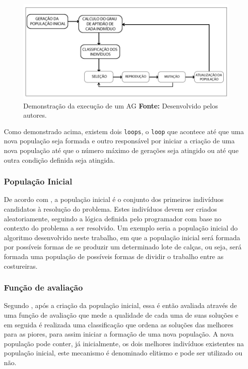 \begin{figure}[h!]
	\centerline{\includegraphics[scale=0.6]{./imagens/algoritimos_geneticos.jpg}}
	\caption[Demonstração da execução de um AG]
	{Demonstração da execução de um AG \textbf{Fonte:} Desenvolvido pelos autores.}
	\label{fig:representacao_ags}
\end{figure}

\par Como demonstrado acima, existem dois \texttt{loops}, o
\texttt{loop} que acontece até que uma nova população seja formada e outro
responsável por  iniciar a criação de uma nova população até que o
número máximo de gerações seja atingido ou até que outra condição definida seja
atingida.

\subsubsection{População Inicial}

\par De acordo com , a população inicial 
é o conjunto dos primeiros indivíduos candidatos à resolução do problema. Estes
indivíduos devem ser criados aleatoriamente, seguindo a lógica definida pelo programador com base no contexto do 
problema a ser resolvido. Um exemplo seria a população inicial do algoritmo desenvolvido neste trabalho, 
em que a população inicial será formada por possíveis formas de se produzir um determinado lote de calças, 
ou seja, será formada uma população de possíveis formas de dividir o trabalho entre as costureiras.

\subsubsection{Função de avaliação}

\par Segundo , após a criação da população
inicial, essa é então avaliada através de uma função de avaliação que mede a
qualidade de cada uma de suas soluções e em seguida é realizada uma classificação que 
ordena as soluções das melhores para as piores, para assim iniciar a formação de 
uma nova população. A nova população pode conter, já inicialmente, os dois melhores 
indivíduos existentes na população inicial, este mecanismo é denominado elitismo e 
pode ser utilizado ou não.

